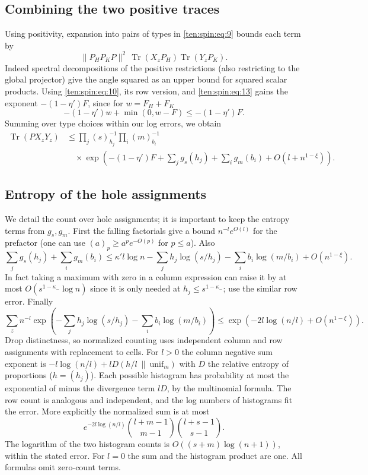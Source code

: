 \subsection{Combining the two positive traces}
Using positivity, expansion into pairs of types in \eqref{ten:spin:eq:9} bounds each term by
\[
 \|P_H P_KP\|^2\,\operatorname{Tr}(X_z P_H)\operatorname{Tr}(Y_z P_K).
\]
Indeed spectral decompositions of the positive restrictions (also restricting to the global projector) give the angle squared as an upper bound for squared scalar products. Using \eqref{ten:spin:eq:10}, its row version, and \eqref{ten:spin:eq:13} gains the exponent \(-(1-\eta')F\), since for \(w=F_H+F_K\)
\[
 -(1-\eta') w+\min(0,w-F)\le -(1-\eta')F .
\]
Summing over type choices within our log errors, we obtain
\begin{equation}
 \begin{aligned}
 \operatorname{Tr}(P X_z Y_z)
 &\le \prod_j(s)_{h_j}^{-1}\prod_i(m)_{b_i}^{-1}\\
 &\quad\times\exp\left(-(1-\eta')F+\sum_j g_s(h_j)+\sum_i g_m(b_i)
                     +O(l+n^{1-\xi})\right).
 \end{aligned}
 \label{ten:spin:eq:14}
\end{equation}

\subsection{Entropy of the hole assignments}
We detail the count over hole assignments; it is important to keep the entropy terms from \(g_s,g_m\). First the falling factorials give a bound \(n^{-l} e^{O(l)}\) for the prefactor (one can use \((a)_p\ge a^p e^{-O(p)}\) for \(p\le a\)). Also
\begin{equation}
 \sum_j g_s(h_j)+\sum_i g_m(b_i)
 \le \kappa' l\log n
   -\sum_j h_j\log(s/h_j)-\sum_i b_i\log(m/b_i)
   +O(n^{1-\xi}).
 \label{ten:spin:eq:15}
\end{equation}
In fact taking a maximum with zero in a column expression can raise it by at most \(O(s^{1-\kappa_-}\log n)\) since it is only needed at \(h_j\le s^{1-\kappa_-}\); use the similar row error. Finally
\begin{equation}
 \sum_z n^{-l}\exp\left(-\sum_j h_j\log(s/h_j)-\sum_i b_i\log(m/b_i)\right)
 \le \exp\left(-2l\log(n/l)+O(n^{1-\xi})\right).
 \label{ten:spin:eq:16}
\end{equation}
Drop distinctness, so normalized counting uses independent column and row assignments with replacement to cells. For \(l>0\) the column negative sum exponent is \(-l\log(n/l)+l D(h/l\ \|\ \mathrm{unif}_m)\) with \(D\) the relative entropy of proportions (\(h=(h_j)\)). Each possible histogram has probability at most the exponential of minus the divergence term \(lD\), by the multinomial formula. The row count is analogous and independent, and the log numbers of histograms fit the error. More explicitly the normalized sum is at most
\[
 e^{-2l\log(n/l)}
 \binom{l+m-1}{m-1}\binom{l+s-1}{s-1}.
\]
The logarithm of the two histogram counts is
$O((s+m)\log(n+1))$, within the stated error. For $l=0$ the sum and
the histogram product are one. All formulas omit zero-count terms.

